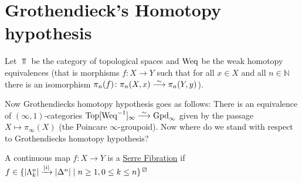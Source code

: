 \section{Grothendieck's Homotopy hypothesis}

Let $\Top$ be the category of topological spaces and $\operatorname{Weq}$ be the weak homotopy equivalences (that is morphisms $f \colon X \to Y$ such that for all $x \in X$ and all $n \in \mathbb{N}$ there is an isomorphism $\pi_n(f)\colon \pi_n(X,x) \isomorphism \pi_n(Y,y)$).

Now Grothendiecks homotopy hypothesis goes as follows:
There is an equivalence of $(\infty ,1)$-categories $\Top[\Weq^{-1}]_{\infty} \isomorphism \Gpd_{\infty}$ given by the passage $X \mapsto \pi_{\infty}(X)$ (the Poincare $\infty$-groupoid).
Now where do we stand with respect to Grothendiecks homotopy hypothesis?

\begin{defi}
    A continuous map $f\colon X \to Y$ is a \underline{Serre Fibration} if $f \in \{ \lvert \Lambda_k^n\rvert \xrightarrow{\lvert i \rvert} \lvert \Delta^n \rvert \mid n\geq1, 0 \leq k \leq n \}^{\lift{}}$
\end{defi}